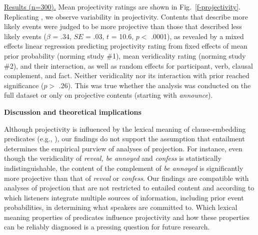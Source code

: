 \documentclass[12pt,fleqn]{article}
\newcommand{\6}{\mbox{$[\hspace*{-.6mm}[$}}
\newcommand{\9}{\mbox{$]\hspace*{-.6mm}]$}}
\begin{document}
\underline{Results (n=300).}  Mean projectivity ratings are shown in Fig.~\ref{f-projectivity}. Replicating \citealt{tbd-variability}, we observe variability in projectivity. Contents that describe more likely events were judged to be more projective than those that described less likely events ($\beta$ = .34, $SE$ = .03, $t$ = 10.6, $p <$ .0001), as revealed by a mixed effects linear regression predicting projectivity rating from fixed effects of mean prior probability (norming study \#1), mean veridicality rating (norming study \#2), and their interaction, as well as random effects for participant, verb, clausal complement, and fact. Neither veridicality nor its interaction with prior reached significance ($p >$ .26). This was true whether the analysis was conducted on the full dataset or only on projective contents (starting with {\em announce}).

{\bf Discussion and theoretical implications}

Although projectivity is influenced by the lexical meaning of clause-embedding predicates (e.g., \citealt{karttunen71b,tbd-variability}), our findings do not support the assumption that entailment determines the empirical purview of analyses of projection. For instance, even though the veridicality of {\em reveal, be annoyed} and {\em confess} is statistically indistinguishable, the content of the complement of {\em be annoyed} is significantly more projective than that of {\em reveal} or {\em confess}. Our findings are compatible with analyses of projection that are not restricted to entailed content and according to which listeners integrate multiple sources of information, including prior event probabilities, in determining what speakers are committed to. Which lexical meaning properties of predicates influence projectivity and how these properties can be reliably diagnosed is a pressing question for future research. 
 
\end{document}
